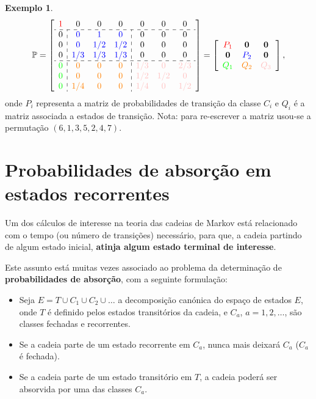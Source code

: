 \documentclass[
  11pt,
  a4paper,
]{book}
\theoremstyle{definition}
\theoremstyle{definition}
\newtheorem{example}{Exemplo}[chapter]
\theoremstyle{definition}
\theoremstyle{definition}
\theoremstyle{remark}
\begin{document}
\begin{example}
\[
\mathbb{P} =
\left[
\begin{array}{c:ccc:ccc}
\color{red}{1} & 0 & 0 & 0 & 0 & 0 & 0  \\ \hdashline
0 & \color{blue}{0} & \color{blue}{1} & \color{blue}{0} & 0 & 0 & 0  \\
0 & \color{blue}{0} & \color{blue}{1/2} & \color{blue}{1/2} & 0 & 0 & 0 \\
0 & \color{blue}{1/3} & \color{blue}{1/3} & \color{blue}{1/3} & 0 & 0 & 0  \\ \hdashline
\color{green}{0} & \color{orange}{0} & \color{orange}{0} & \color{orange}{0} & \color{pink}{1/3} & \color{pink}{0} & \color{pink}{2/3}  \\
\color{green}{0} & \color{orange}{0} & \color{orange}{0} & \color{orange}{0} & \color{pink}{1/2} & \color{pink}{1/2} & \color{pink}{0}  \\
\color{green}{0} & \color{orange}{1/4} & \color{orange}{0} & \color{orange}{0} & \color{pink}{1/4} & \color{pink}{0} & \color{pink}{1/2}  
\end{array}
\right]
=
\left[
\begin{array}{ccc}
\color{red}{P_1} & \textbf{0} & \textbf{0} \\
\textbf{0} & \color{blue}{P_2} & \textbf{0} \\
\color{green}{Q_1} & \color{orange}{Q_2} & \color{pink}{Q_3}
\end{array}
\right],
\]
onde \(P_i\) representa a matriz de probabilidades de transição da classe \(C_i\) e \(Q_i\) é a matriz associada a estados de transição. Nota: para re-escrever a matriz usou-se a permutação \((6,1,3,5,2,4,7)\).
\end{example}

\section{Probabilidades de absorção em estados recorrentes}\label{probabilidades-de-absorcao-em-estados-recorrentes}

Um dos cálculos de interesse na teoria das cadeias de Markov está relacionado com o tempo (ou número de transições) necessário, para que, a cadeia partindo de algum estado inicial, \textbf{atinja algum estado terminal de interesse}.

Este assunto está muitas vezes associado ao problema da determinação de \textbf{probabilidades de absorção}, com a seguinte formulação:

\begin{itemize}
\item
  Seja \(E=T \cup C_1 \cup C_2 \cup \dots\) a decomposição canónica do espaço de estados \(E\), onde \(T\) é definido pelos estados transitórios da cadeia, e \(C_a\), \(a=1,2,\dots\), são classes fechadas e recorrentes.
\item
  Se a cadeia parte de um estado recorrente em \(C_a\), nunca mais deixará \(C_a\) (\(C_a\) é fechada).
\item
  Se a cadeia parte de um estado transitório em \(T\), a cadeia poderá ser absorvida por uma das classes \(C_a\).
\end{itemize}
\end{document}

